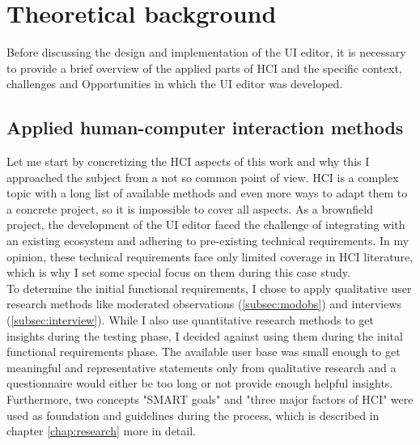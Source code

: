 
%
\chapter{Theoretical background}
\label{chap:background}

Before discussing the design and implementation of the UI editor, it is necessary to provide a brief overview of the applied parts of HCI and the specific context, challenges and Opportunities in which the UI editor was developed.
% 

\section{Applied human-computer interaction methods}

Let me start by concretizing the HCI aspects of this work and why this I approached the subject from a not so common point of view.
HCI is a complex topic with a long list of available methods and even more ways to adapt them to a concrete project, so it is impossible to cover all aspects.
As a \gls{brownfield} project,
the development of the UI editor faced the challenge of integrating with an existing ecosystem and adhering to pre-existing technical requirements.
In my opinion, these technical requirements face only limited coverage in HCI literature, which is why I set some special focus on them during this case study.
\\
To determine the initial functional requirements, I chose to apply qualitative user research methods like moderated observations (\ref{subsec:modobs}) and interviews (\ref{subsec:interview}).
While I also use quantitative research methods to get insights during the testing phase, I decided against using them during the inital functional requirements phase.
The available user base was small enough to get meaningful and representative statements only from qualitative research and a questionnaire would either be too long or not provide enough helpful insights.
\\
Furthermore, two concepts "SMART goals" and "three major factors of HCI" were used as foundation and guidelines during the process, which is described in chapter \ref{chap:research} more in detail.

